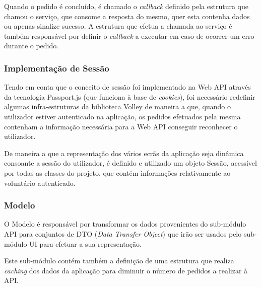 \medskip

Quando o pedido é concluído, é chamado o \textit{callback} definido pela estrutura que chamou o serviço, que consome a resposta do mesmo, quer esta contenha dados ou apenas sinalize sucesso. A estrutura que efetua a chamada ao serviço é também responsável por definir o \textit{callback} a executar em caso de ocorrer um erro durante o pedido.


\subsubsection{Implementação de Sessão}

Tendo em conta que o conceito de sessão foi implementado na Web API através da tecnologia Passport.js (que funciona à base de \textit{cookies}), foi necessário redefinir algumas infra-estruturas da biblioteca Volley de maneira a que, quando o utilizador estiver autenticado na aplicação, os pedidos efetuados pela mesma contenham a informação necessária para a Web API conseguir reconhecer o utilizador.

\medskip

De maneira a que a representação dos vários ecrãs da aplicação seja dinâmica consoante a sessão do utilizador, é definido e utilizado um objeto Sessão, acessível por todas as classes do projeto, que contém informações relativamente ao voluntário autenticado.

\subsubsection{Modelo}

O Modelo é responsável por transformar os dados provenientes do sub-módulo API para conjuntos de DTO (\textit{Data Transfer Object}) que irão ser usados pelo sub-módulo UI para efetuar a sua representação.

\medskip

Este sub-módulo contém também a definição de uma estrutura que realiza \textit{caching} dos dados da aplicação para diminuir o número de pedidos a realizar à API.